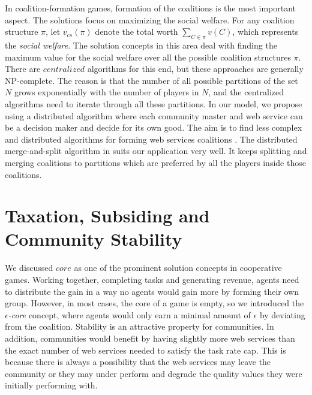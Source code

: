 
In coalition-formation games, formation of the coalitions is the
most important aspect. The solutions focus on maximizing the
social welfare. For any coalition structure $\pi$, let
$v_{cs}(\pi)$ denote the total worth $\sum_{C \in \pi}{v(C)}$,
which represents the \emph{social welfare}. The solution concepts
in this area deal with finding the maximum value for the social
welfare over all the possible coalition structures $\pi$. There
are $centralized$ algorithms for this end, but these approaches
are generally NP-complete. The reason is that the number of all
possible partitions of the set $N$ grows exponentially with the
number of players in $N$, and the centralized algorithms need to
iterate through all these partitions.
In our model, we propose using a distributed algorithm where each
community master and web service can be a decision maker and
decide for its own good. The aim is to find less complex and
distributed algorithms for forming web services coalitions
\cite{DBLP:journals/igtr/AptW09,Dieckmann02dynamiccoalition,ray2007game}.
The distributed merge-and-split algorithm in
\cite{DBLP:journals/igtr/AptW09} suits our application very well.
It keeps splitting and merging coalitions to partitions which are
preferred by all the players inside those coalitions.


\section{Taxation, Subsiding and Community Stability}\label{s:tax}

We discussed $core$ as one of the prominent solution concepts in
cooperative games. Working together, completing tasks and
generating revenue, agents need to distribute the gain in a way no
agents would gain more by forming their own group. However, in
most cases, the core of a game is empty, so we introduced the
\emph{$\epsilon$-core} concept, where agents would only earn a
minimal amount of $\epsilon$ by deviating from the coalition.
Stability is an attractive property for communities. In addition,
communities would benefit by having slightly more web services
than the exact number of web services needed to satisfy the task
rate cap. This is because there is always a possibility that the
web services may leave the community or they may under perform and
degrade the quality values they were initially performing with.

